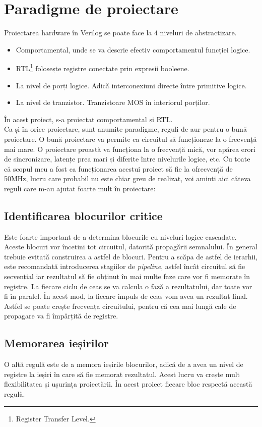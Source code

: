 \documentclass[12pt,twoside,a4paper,fleqn]{book}
\theoremstyle{definition}
\begin{document}
\section{Paradigme de proiectare}
\label{hardware_gooddesign}
Proiectarea hardware în Verilog se poate face la $4$ niveluri de abstractizare. 
\begin{itemize}
\item Comportamental, unde se va descrie efectiv comportamentul funcției logice.
\item RTL\footnote{Register Transfer Level.} folosește registre conectate prin expresii booleene.
\item La nivel de porți logice. Adică interconexiuni directe între primitive logice.
\item La nivel de tranzistor. Tranzistoare MOS în interiorul porților.
\end{itemize}
În acest proiect, s-a proiectat comportamental și RTL.\\
Ca și în orice proiectare, sunt anumite paradigme, reguli de aur pentru o bună proiectare. O bună proiectare va permite ca circuitul să funcționeze la o frecvență mai mare. O proiectare proastă va funcționa la o frecvență mică, vor apărea erori de sincronizare, latențe prea mari și diferite între nivelurile logice, etc. \cite{high_performance_fpga, peter_verilog, jack_marshall}
Cu toate că scopul meu a fost ca funcționarea acestui proiect să fie la  ofrecvență de 50MHz, lucru care probabil nu este chiar greu de realizat, voi aminti aici câteva reguli care m-au ajutat foarte mult în proiectare:
\subsection{Identificarea blocurilor critice}
Este foarte important de a determina blocurile cu niveluri logice cascadate. Aceste blocuri vor încetini tot circuitul, datorită propagării semnalului. În general trebuie evitată construirea a astfel de blocuri. Pentru a scăpa de astfel de ierarhii, este recomandată introducerea stagiilor de \emph{pipeline}, astfel încât circuitul să fie secvențial iar rezultatul să fie obținut în mai multe faze care vor fi memorate în registre. La fiecare ciclu de ceas se va calcula o fază a rezultatului, dar toate vor fi în paralel. În acest mod, la fiecare impuls de ceas vom avea un rezultat final. Astfel se poate crește frecvența circuitului, pentru că cea mai lungă cale de propagare va fi împărțită de registre. \cite{high_performance_fpga}
\subsection{Memorarea ieșirilor}
O altă regulă este de a memora ieșirile blocurilor, adică de a avea un nivel de registre la ieșiri în care să fie memorat rezultatul. Acest lucru va crește mult flexibilitatea și ușurința proiectării. În acest proiect fiecare bloc respectă această regulă. \cite{xilinx_coding_practices}
\end{document}
